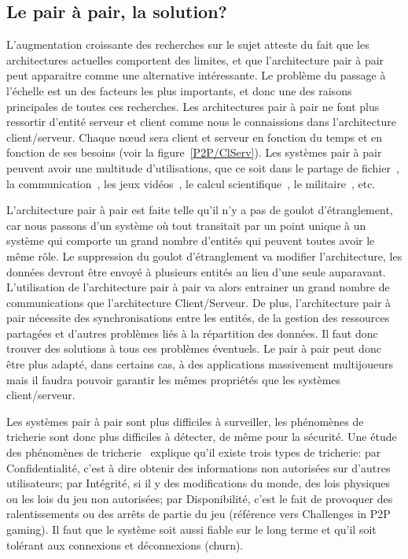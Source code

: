 	\subsection{Le pair à pair, la solution?}
	\par
	L'augmentation croissante des recherches sur le sujet atteste du fait que les architectures actuelles comportent des limites, et que l'architecture pair à pair peut apparaitre comme une alternative intéressante. Le problème du passage à l'échelle est un des facteurs les plus importants, et donc une des raisons principales de toutes ces recherches. Les architectures pair à pair ne font plus ressortir d'entité serveur et client comme nous le connaissions dans l'architecture client/serveur. Chaque nœud sera client et serveur en fonction du temps et en fonction de ses besoins (voir la figure~\ref{P2P/ClServ}). Les systèmes pair à pair peuvent avoir une multitude d'utilisations, que ce soit dans le partage de fichier~\cite{gnutella,napster,kazaa}, la communication~\cite{skype}, les jeux vidéos~\cite{starwars}, le calcul scientifique~\cite{Pastry,xtremweb,chord}, le militaire~\cite{jxta}, etc. \\
	\par L'architecture pair à pair est faite telle qu'il n'y a pas de goulot d'étranglement, car nous passons d'un système où tout transitait par un point unique à un système qui comporte un grand nombre d'entités qui peuvent toutes avoir le même rôle. Le suppression du goulot d'étranglement va modifier l'architecture, les données devront être envoyé à plusieurs entités au lieu d'une seule auparavant. L'utilisation de l'architecture pair à pair va alors entrainer un grand nombre de communications que l'architecture Client/Serveur. De plus, l'architecture pair à pair nécessite des synchronisations entre les entités, de la gestion des ressources partagées et d'autres problèmes liés à la répartition des données. Il faut donc trouver des solutions à tous ces problèmes éventuels. Le pair à pair peut donc être plus adapté, dans certains cas, à des applications massivement multijoueurs mais il faudra pouvoir garantir les mêmes propriétés que les systèmes client/serveur. \\
	\par Les systèmes pair à pair sont plus difficiles à surveiller, les phénomènes de tricherie sont donc plus difficiles à détecter, de même pour la sécurité. Une étude des phénomènes de tricherie~\cite{1198269} explique qu'il existe trois types de tricherie: par Confidentialité, c'est à dire obtenir des informations non autorisées sur d'autres utilisateurs; par Intégrité, si il y des modifications du monde, des lois physiques ou les lois du jeu non autorisées; par Disponibilité, c'est le fait de provoquer des ralentissements ou des arrêts de partie du jeu (référence vers Challenges in P2P gaming). Il faut que le système soit aussi fiable sur le long terme et qu'il soit tolérant aux connexions et déconnexions (churn).\\
